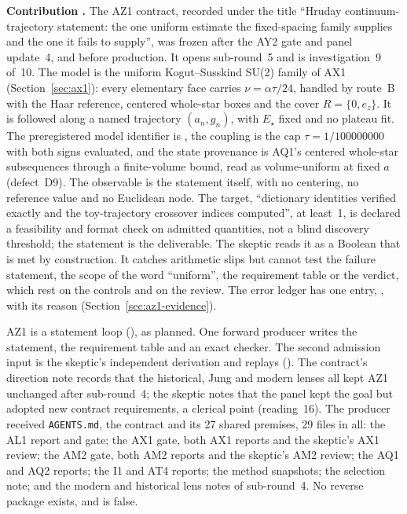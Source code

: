 \textbf{Contribution .} The AZ1 contract, recorded under
the title ``Hruday continuum-trajectory statement: the one uniform estimate the
fixed-spacing family supplies and the one it fails to supply'', was frozen
after the AY2 gate and panel update~4, and before production. It opens
sub-round~5 and is investigation~9 of~10. The model is the uniform
Kogut--Susskind SU(2) family of AX1 (Section~\ref{sec:ax1}): every elementary
face carries $\nu=\alpha\tau/24$, handled by route~B with the Haar reference,
centered whole-star boxes and the cover $R=\{0,e_z\}$. It is followed along a
named trajectory $(a_n,g_n)$, with $E_\star$ fixed and no plateau fit. The
preregistered model identifier is ,
the coupling is the cap $\tau=1/100000000$ with both signs evaluated, and the
state provenance is AQ1's centered whole-star subsequences through a
finite-volume bound, read as volume-uniform at fixed $a$ (defect~D9). The
observable is the statement itself, with no centering, no reference value and
no Euclidean node. The target, ``dictionary identities verified exactly and
the toy-trajectory crossover indices computed'', at least~1, is declared a
feasibility and format check on admitted quantities, not a blind discovery
threshold; the statement is the deliverable. The skeptic reads it as a
Boolean that is met by construction. It catches arithmetic slips but cannot
test the failure statement, the scope of the word ``uniform'', the
requirement table or the verdict, which rest on the controls and on the
review. The error ledger has one entry, , with its
reason (Section~\ref{sec:az1-evidence}).

AZ1 is a statement loop (), as planned. One forward
producer writes the statement, the requirement table and an exact checker.
The second admission input is the skeptic's independent derivation and
replays (). The contract's
direction note records that the historical, Jung and modern lenses all kept
AZ1 unchanged after sub-round~4; the skeptic notes that the panel kept the
goal but adopted new contract requirements, a clerical point (reading~16). The
producer received \texttt{AGENTS.md}, the contract and its 27 shared
premises, 29 files in all: the AL1 report and gate; the AX1 gate, both AX1
reports and the skeptic's AX1 review; the AM2 gate, both AM2 reports and the
skeptic's AM2 review; the AQ1 and AQ2 reports; the I1 and AT4 reports; the
method snapshots; the selection note; and the modern and historical lens notes
of sub-round~4. No reverse package exists, and
 is false.

